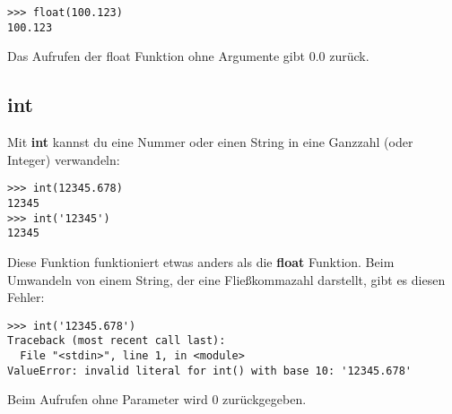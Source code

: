 \begin{Verbatim}[frame=single]
>>> float(100.123)
100.123
\end{Verbatim}

\noindent
Das Aufrufen der float Funktion ohne Argumente gibt 0.0 zurück.

\subsection*{int}

Mit \textbf{int} kannst du eine Nummer oder einen String in eine Ganzzahl (oder Integer) verwandeln:

\begin{Verbatim}[frame=single]
>>> int(12345.678)
12345
>>> int('12345')
12345
\end{Verbatim}

Diese Funktion funktioniert etwas anders als die \textbf{float} Funktion. Beim Umwandeln von einem String, der eine Fließkommazahl darstellt, gibt es diesen Fehler:

\begin{Verbatim}[frame=single]
>>> int('12345.678')
Traceback (most recent call last):
  File "<stdin>", line 1, in <module>
ValueError: invalid literal for int() with base 10: '12345.678'
\end{Verbatim}

\noindent
Beim Aufrufen ohne Parameter wird 0 zurückgegeben.


